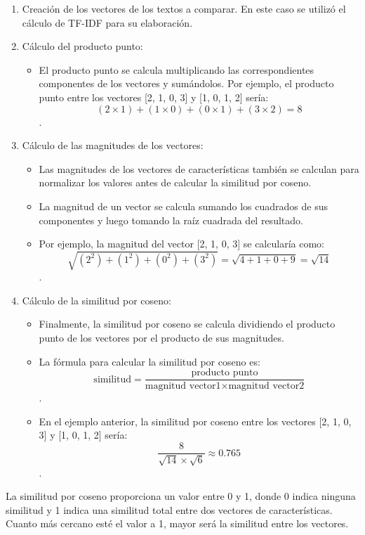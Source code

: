 \documentclass[a4paper, 12pt]{article}
\begin{document}
\begin{enumerate}
\item Creación de los vectores de los textos a comparar. En este caso se utilizó el cálculo de TF-IDF para su elaboración.
\item Cálculo del producto punto:
\begin{itemize}
 \item  El producto punto se calcula multiplicando las correspondientes componentes de los vectores y sumándolos. Por ejemplo, el producto punto entre los vectores [2, 1, 0, 3] y [1, 0, 1, 2] sería: \[(2\times 1) + (1\times 0) + (0\times 1) + (3\times 2) = 8\].
\end{itemize}
\item  Cálculo de las magnitudes de los vectores:
\begin{itemize}
  \item  Las magnitudes de los vectores de características también se calculan para normalizar los valores antes de calcular la similitud por coseno.
  \item  La magnitud de un vector se calcula sumando los cuadrados de sus componentes y luego tomando la raíz cuadrada del resultado.
  \item  Por ejemplo, la magnitud del vector [2, 1, 0, 3] se calcularía como:\[\sqrt{(2^2) + (1^2) + (0^2) + (3^2)} = \sqrt{4 + 1 + 0 + 9} = \sqrt{14}\].
\end{itemize}

\item Cálculo de la similitud por coseno:
\begin{itemize}
   \item Finalmente, la similitud por coseno se calcula dividiendo el producto punto de los vectores por el producto de sus magnitudes.
   \item La fórmula para calcular la similitud por coseno es: \[\text{similitud} = \frac{{\text{producto punto}}}{{\text{magnitud vector1} \times \text{magnitud vector2}}}\].
  \item En el ejemplo anterior, la similitud por coseno entre los vectores [2, 1, 0, 3] y [1, 0, 1, 2] sería: \[\frac{8}{{\sqrt{14} \times \sqrt{6}}} \approx 0.765\].
\end{itemize}
\end{enumerate}
La similitud por coseno proporciona un valor entre 0 y 1, donde 0 indica ninguna similitud y 1 indica una similitud total entre dos vectores de características. Cuanto más cercano esté el valor a 1, mayor será la similitud entre los vectores.
\end{document}
